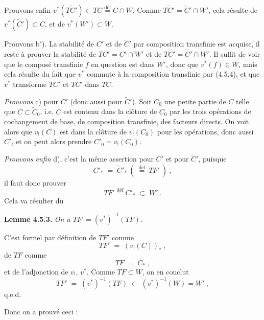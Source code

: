 \documentclass[11pt]{article}
\newcommand{\printedpage}[1]{\marginpar{\footnotesize p.~#1}}
\newcommand{\msp}[1]{\marginpar{\footnotesize [#1]}}
\newcommand{\defeq}{\overset{\text{déf}}{=}}
\begin{document}
Prouvons enfin $v^*(T\tilde{C}') \subset TC \defeq C \cap W$. Comme $T\tilde{C}' = \tilde{C}' \cap W'$, cela résulte de $v^*(\tilde{C}') \subset C$, et de $v^*(W') \subset W$.

Prouvons b$'$). La stabilité de $C'$ et de $\tilde{C}'$ par composition transfinie est acquise, il reste à prouver la stabilité de $TC' = C' \cap W'$ et de $T\tilde{C}' = \tilde{C}' \cap W'$. Il suffit de voir que le composé transfinie $f$ en question est dans $W'$, donc que $v^*(f) \in W$, mais cela résulte du fait que $v^*$ commute à la composition transfinie par (4.5.4), et que $v^*$ transforme $TC'$ et $T\tilde{C}'$ dans $TC$.

\textit{Prouvons} c) pour $C'$ (donc aussi pour $\tilde{C}'$). Soit $C_0$ une petite partie de $C$ telle que $C \subset \tilde{C}_0$, i.e. $C$ est contenu dans la clôture de $C_0$ par les trois opérations de cochangement de base, de composition transfinie, des facteurs directs. On voit alors que $v_!(C)$ est dans la clôture de $v_!(C_0)$ pour les opérations, donc aussi $C'$, et on peut alors prendre $C'_0 = v_!(C_0)$.

\textit{Prouvons enfin} d), c'est la même assertion pour $C'$ et pour $\tilde{C}'$, puisque
\[
C'_* \;=\; \tilde{C}'_*\ (\ \defeq\ TF'\ )\ ,
\]
\msp{page 78}
il faut donc prouver
\[
TF' \defeq C'_* \;\subset\; W'\ .
\]
Cela va résulter du
\printedpage{38}

\textbf{Lemme 4.5.3.} \textit{On a $TF' = (v^*)^{-1}(TF)$.}

C'est formel par définition de $TF'$ comme
\[
TF' \;=\; (v_!(C))_*\ ,
\]
de $TF$ comme
\[
TF \;=\; C_*\ ,
\]
et de l'adjonction de $v_!$, $v^*$. Comme $TF \subset W$, on en conclut
\[
TF' \;=\; (v^*)^{-1}(TF) \;\subset\; (v^*)^{-1}(W) = W'\ ,
\]
q.e.d.

Donc on a prouvé ceci :
\end{document}
